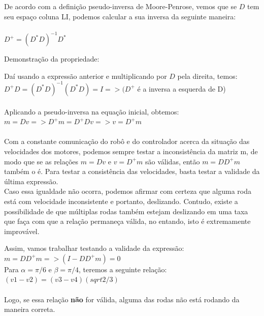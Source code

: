 \documentclass{article}
\begin{document}
De acordo com a definição pseudo-inversa de Moore-Penrose, vemos que se $D$ tem seu espaço coluna LI, podemos calcular a sua inversa da seguinte maneira:
\\ \\ $D^+ = (D^*D)^{-1} D^*$

Demonstração da propriedade:

Daí usando a expressão anterior e multiplicando por $D$ pela direita, temos:
\\ $D^+D = (D^*D)^{-1}(D^*D) = I => (D^+$ é a inversa a esquerda de D)  
\\ \\ Aplicando a pseudo-inversa na equação inicial, obtemos:
$ m = Dv => D^+m = D^+Dv => v = D^+m$
\\ \\ \hspace{1cm} Com a constante comunicação do robô e do controlador acerca da situação das velocidades dos motores, podemos sempre testar a inconsistência da matriz m, de modo que
se as relações $m = Dv$ e $v = D^+m$ são válidas, então $m = DD^+m$ também o é. Para testar a consistência das velocidades, basta testar a validade da última expressão.
\\ \hspace{1cm}Caso essa igualdade não ocorra, podemos afirmar com certeza que alguma roda está com velocidade inconsistente e portanto, deslizando. Contudo, existe a possibilidade de que múltiplas rodas também estejam deslizando em uma taxa que faça com que a relação permaneça válida,
no entando, isto é extremamente improvável.

Assim, vamos trabalhar testando a validade da expressão:
\\ $ m = DD^+m => (I - DD^+m) = 0$
\\ Para $\alpha = \pi/6$ e $\beta = \pi/4$, teremos a seguinte relação:
\\ $(v1 - v2) = (v3 - v4)(sqrt{2/3})$
\\ \\ \hspace{1cm} Logo, se essa relação \textbf{não} for válida, alguma das rodas não está rodando da maneira correta.
\end{document}
